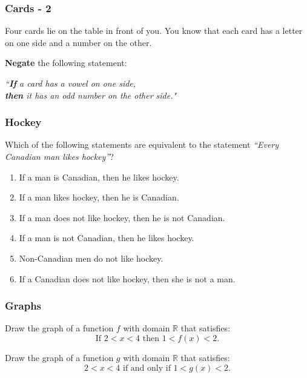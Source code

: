 \documentclass[14pt]{beamer}
\begin{document}
\begin{frame}
	\frametitle{Cards - 2}

	Four cards lie on the table in front of you. You know that each card has a letter
	on one side and a number on the other.

	{\bfseries Negate} the following statement:
	\begin{block}{}
		\emph{``\textbf{If} a card has a vowel on one side, \\ \textbf{then} it has an
		odd number on the other side." }
	\end{block}
\end{frame}

\begin{frame}
	\frametitle{Hockey}

	Which of the following statements are equivalent to the statement \quad \emph{``Every
	Canadian man likes hockey''}?

	\begin{enumerate}
		\item If a man is Canadian, then he likes hockey.

		\item If a man likes hockey, then he is Canadian.

		\item If a man does not like hockey, then he is not Canadian.

		\item If a man is not Canadian, then he likes hockey.

		\item Non-Canadian men do not like hockey.

		\item If a Canadian does not like hockey, then she is not a man.
	\end{enumerate}
\end{frame}

\begin{frame}
	\frametitle{Graphs}

	Draw the graph of a function $f$ with domain $\mathbb{R}$ that satisfies:
	\begin{equation*}
		\text{If }2<x<4 \text{ then }1<f(x)<2.
	\end{equation*}
	\vfill

	Draw the graph of a function $g$ with domain $\mathbb{R}$ that satisfies:
	\begin{equation*}
		2<x<4 \text{ if and only if }1 < g(x) < 2.
	\end{equation*}
	\vfill
\end{frame}
\end{document}
